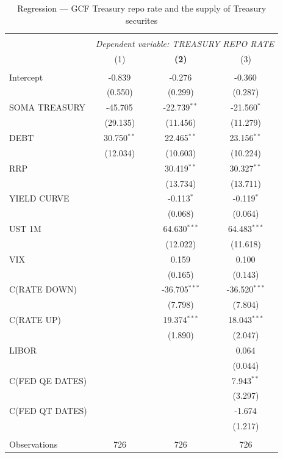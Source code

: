\documentclass[11pt,a4paper,english,oneside]{article}
\begin{document}
\begin{table}[!htbp] \centering
\caption{Regression --- GCF Treasury repo rate and the supply of Treasury securites}
\begin{tabular}{@{\extracolsep{5pt}}lccc}
\\[-1.8ex]\hline
\hline \\[-1.8ex]
& \multicolumn{3}{c}{\textit{Dependent variable: TREASURY REPO RATE}} \
\cr \cline{3-4}
  \\[-1.8ex] & (1) & \textbf{(2)} & (3) \\
\hline \\[-1.8ex]
 Intercept & -0.839$^{}$ & -0.276$^{}$ & -0.360$^{}$ \\
  & (0.550) & (0.299) & (0.287) \\
 SOMA TREASURY & -45.705$^{}$ & -22.739$^{**}$ & -21.560$^{*}$ \\
  & (29.135) & (11.456) & (11.279) \\
 DEBT & 30.750$^{**}$ & 22.465$^{**}$ & 23.156$^{**}$ \\
  & (12.034) & (10.603) & (10.224) \\
 RRP & & 30.419$^{**}$ & 30.327$^{**}$ \\
  & & (13.734) & (13.711) \\
 YIELD CURVE & & -0.113$^{*}$ & -0.119$^{*}$ \\
  & & (0.068) & (0.064) \\
 UST 1M & & 64.630$^{***}$ & 64.483$^{***}$ \\
  & & (12.022) & (11.618) \\
 VIX & & 0.159$^{}$ & 0.100$^{}$ \\
  & & (0.165) & (0.143) \\
 C(RATE DOWN) & & -36.705$^{***}$ & -36.520$^{***}$ \\
  & & (7.798) & (7.804) \\
 C(RATE UP) & & 19.374$^{***}$ & 18.043$^{***}$ \\
  & & (1.890) & (2.047) \\
 LIBOR & & & 0.064$^{}$ \\
  & & & (0.044) \\
 C(FED QE DATES) & & & 7.943$^{**}$ \\
  & & & (3.297) \\
 C(FED QT DATES) & & & -1.674$^{}$ \\
  & & & (1.217) \\
\hline \\[-1.8ex]
 Observations & 726 & 726 & 726 \\

\end{tabular}
\end{table}
\end{document}
